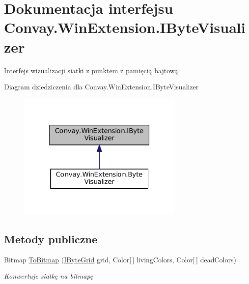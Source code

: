 \hypertarget{interface_convay_1_1_win_extension_1_1_i_byte_visualizer}{}\section{Dokumentacja interfejsu Convay.\+Win\+Extension.\+I\+Byte\+Visualizer}
\label{interface_convay_1_1_win_extension_1_1_i_byte_visualizer}


Interfejs wizualizacji siatki z punktem z pamięcią bajtową  




Diagram dziedziczenia dla Convay.\+Win\+Extension.\+I\+Byte\+Visualizer
\nopagebreak
\begin{figure}[H]
\begin{center}
\leavevmode
\includegraphics[width=232pt]{interface_convay_1_1_win_extension_1_1_i_byte_visualizer__inherit__graph}
\end{center}
\end{figure}
\subsection*{Metody publiczne}
\begin{DoxyCompactItemize}
\item 
Bitmap \hyperlink{interface_convay_1_1_win_extension_1_1_i_byte_visualizer_a08b8938af09e659a709c2e097268c92f}{To\+Bitmap} (\hyperlink{interface_convay_1_1_core_1_1_interfaces_1_1_i_byte_grid}{I\+Byte\+Grid} grid, Color\mbox{[}$\,$\mbox{]} living\+Colors, Color\mbox{[}$\,$\mbox{]} dead\+Colors)
\begin{DoxyCompactList}\small\item\em Konwertuje siatkę na bitmapę \end{DoxyCompactList}\end{DoxyCompactItemize}


